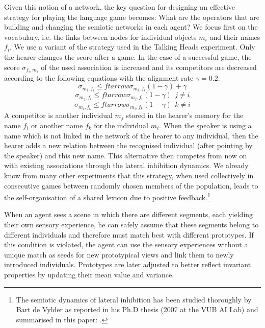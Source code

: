 Given this notion of a network, the key question for designing an effective 
strategy for playing the language game becomes: What are the operators that are building and
changing the semiotic networks in each agent? We focus first on the
vocabulary, i.e. the links between nodes for individual objects $m_i$ and their 
names $f_i$. We use a variant of the strategy used in the Talking Heads experiment. 
Only the hearer changes the score after a game. 
In the case of a successful game, the score $\sigma_{f_i,m_i}$ of the used association is 
increased and its competitors are decreased according to the following
equations with the alignment rate $\gamma = 0.2$: 
\begin{equation}
 \sigma_{m_i,f_i} ≤ftarrow \sigma_{m_i,f_i} (1-\gamma) + \gamma
\end{equation}
\begin{equation}
 \sigma_{m_j,f_i} ≤ftarrow \sigma_{m_j,f_i} (1-\gamma) ~~j \neq i
\end{equation}
\begin{equation}
 \sigma_{m_i,f_k} ≤ftarrow \sigma_{m_i,f_k} (1-\gamma) ~~k \neq i
\end{equation}
A competitor is another individual $m_j$ stored in the hearer's memory 
for the name $f_i$ or another name $f_k$ for the individual 
$m_i$. When the speaker is using a name which is not linked in the network 
of the hearer to any individual, then the hearer adds a new relation between 
the recognised individual (after pointing by the speaker) and this new name. 
This alternative then competes from 
now on with existing associations through the lateral inhibition dynamics. 
We already know from many other experiments that this strategy, when used collectively in 
consecutive games between randomly chosen members of the population, leads to the  
self-organisation of a shared lexicon due to positive feedback.\footnote{
The semiotic dynamics of lateral inhibition has been studied thoroughly by Bart de Vylder as reported in his Ph.D thesis 
(2007 at the VUB AI Lab) and summarised in this paper: \cite{deVylder:2006}.}
 
When an agent sees a scene in which there are different segments, each yielding their own sensory
experience, he can safely assume that these segments belong to 
different individuals and therefore must match best with 
different prototypes. If this condition is violated, the agent
can use the sensory experiences without a unique match as seeds for new
prototypical views and link them to newly introduced individuals.  
Prototypes are later adjusted to better reflect invariant properties by updating their 
mean value and variance. 



